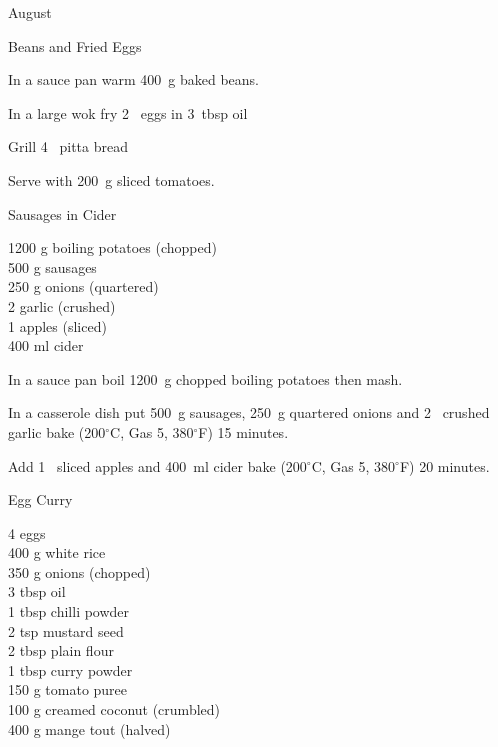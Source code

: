 \begin{menu}{August}
\begin{recipe}{1}{Beans and Fried Eggs}
\begin{ingredients}
		\end{ingredients}
	
    \begin{instructions}
    \item 
        In a sauce pan warm
        400~g  baked beans.
      \item 
        In a large wok fry
        2~  eggs
        in
        3~tbsp  oil\item 
        Grill
        4~  pitta bread\item 
        Serve with 200~g sliced tomatoes.
      
    \end{instructions}
    \end{recipe}%
  
    \begin{recipe}{2}{Sausages in Cider}%
		\begin{ingredients}
		1200 g boiling potatoes (chopped) \\
	500 g sausages  \\
	250 g onions (quartered) \\
	2  garlic (crushed) \\
	1  apples (sliced) \\
	400 ml cider  \\
	
		\end{ingredients}
	
    \begin{instructions}
    \item 
        In a sauce pan boil
        1200~g chopped boiling potatoes
        then mash.
      \item 
        In a casserole dish put
        500~g  sausages,
        250~g quartered onions
        and
        2~ crushed garlic
        bake (200$^{\circ}$C, Gas 5, 380$^{\circ}$F) 15 minutes.
      \item 
        Add 1~ sliced apples
        and
        400~ml  cider
        bake (200$^{\circ}$C, Gas 5, 380$^{\circ}$F) 20 minutes.
      
    \end{instructions}
    \end{recipe}%
  
    \begin{recipe}{2}{Egg Curry}%
		\begin{ingredients}
		4  eggs  \\
	400 g white rice  \\
	350 g onions (chopped) \\
	3 tbsp oil  \\
	1 tbsp chilli powder  \\
	2 tsp mustard seed  \\
	2 tbsp plain flour  \\
	1 tbsp curry powder  \\
	150 g tomato puree  \\
	100 g creamed coconut (crumbled) \\
	400 g mange tout (halved) \\
	

\end{ingredients}
\end{recipe}
\end{menu}
